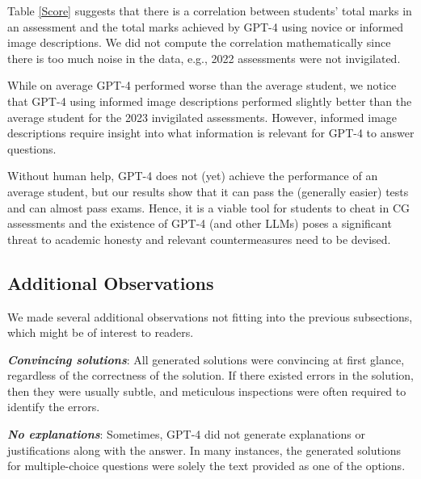 \documentclass[sigconf,review]{acmart}
\begin{document}
Table \ref{Score} suggests that there is a correlation between students' total marks in an assessment and the total marks achieved by GPT-4 using novice or informed image descriptions. We did not compute the correlation mathematically since there is too much noise in the data, e.g., 2022 assessments were not invigilated.

While on average GPT-4 performed worse than the average student, we notice that GPT-4 using informed image descriptions performed slightly better than the average student for the 2023 invigilated assessments. However, informed image descriptions require insight into what information is relevant for GPT-4 to answer questions.

Without human help, GPT-4 does not (yet) achieve the performance of an average student, but our results show that it can pass the (generally easier) tests and can almost pass exams. Hence, it is a viable tool for students to cheat in CG assessments and the existence of GPT-4 (and other LLMs) poses a significant threat to academic honesty and relevant countermeasures need to be devised.


\subsection{Additional Observations}

We made several additional observations not fitting into the previous subsections, which might be of interest to readers.

\noindent \textit{\textbf{Convincing solutions}}: All generated solutions were convincing at first glance, regardless of the correctness of the solution. If there existed errors in the solution, then they were usually subtle, and meticulous inspections were often required to identify the errors.

\noindent \textit{\textbf{No explanations}}: Sometimes, GPT-4 did not generate explanations or justifications along with the answer. In many instances, the generated solutions for multiple-choice questions were solely the text provided as one of the options.
\end{document}
